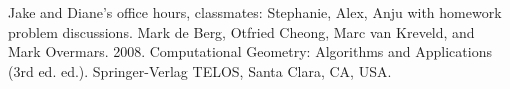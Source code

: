 \documentclass [12pt]{article}
\begin{document}




    




\begin{thebibliography}{1}
    Jake and Diane's office hours, classmates: Stephanie, Alex, Anju with homework problem discussions.
    Mark de Berg, Otfried Cheong, Marc van Kreveld, and Mark Overmars. 2008. Computational Geometry: Algorithms and Applications (3rd ed. ed.). Springer-Verlag TELOS, Santa Clara, CA, USA.
\end{thebibliography}
\end{document}
